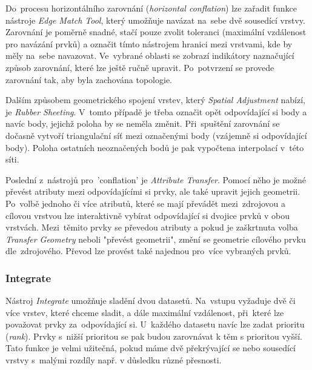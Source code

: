Do~procesu horizontálního zarovnání (\textit{horizontal conflation}) lze zařadit funkce nástroje \textit{Edge Match Tool}, který umožňuje navázat na~sebe dvě sousedící vrstvy.
Zarovnání je poměrně snadné, stačí pouze zvolit toleranci (maximální vzdálenost pro navázání prvků) a označit tímto nástrojem hranici mezi vrstvami, kde by měly na~sebe
navazovat. Ve~vybrané oblasti se zobrazí indikátory naznačující způsob zarovnání, které lze ještě ručně upravit. Po~potvrzení se provede zarovnání tak, aby byla zachována
topologie.

Dalším způsobem geometrického spojení vrstev, který \textit{Spatial Adjustment} nabízí, je \textit{Rubber Sheeting}. V~tomto případě je třeba označit opět odpovídající si body
a navíc body, jejichž poloha by se neměla změnit. Při~spuštění zarovnání se dočasně vytvoří triangulační síť mezi označenými body (vzájemně si odpovídající body). Poloha 
ostatních neoznačených bodů je pak vypočtena interpolací v~této síti.

Poslední z~nástrojů pro~'conflation' je \textit{Attribute Transfer}. Pomocí něho je možné převést atributy mezi odpovídajícími si prvky, ale také upravit jejich geometrii.
Po~volbě jednoho či více atributů, které se mají převádět mezi~zdrojovou a cílovou vrstvou lze interaktivně vybírat odpovídající si dvojice prvků v obou vrstvách. Mezi~těmito
prvky se převedou atributy a pokud je zaškrtnuta volba \textit{Transfer Geometry} neboli "převést geometrii", změní se geometrie cílového prvku dle~zdrojového. Převod lze
provést také najednou pro~více vybraných prvků.



\subsubsection{Integrate}

Nástroj \textit{Integrate} umožňuje sladění dvou datasetů. Na~vstupu vyžaduje dvě či více vrstev, které chceme sladit, a dále maximální vzdálenost, při~které lze považovat
prvky za~odpovídající si. U~každého datasetu navíc lze zadat prioritu (\textit{rank}). Prvky s~nižší prioritou se pak budou zarovnávat k těm s prioritou vyšší. Tato funkce
je velmi užitečná, pokud máme dvě překrývající se nebo sousedící vrstvy s~malými rozdíly např. v důsledku různé přesnosti.

